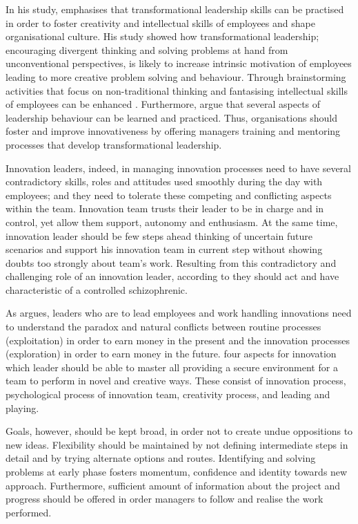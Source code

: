 In his study, \citet{jung2001transformational} emphasises that transformational leadership skills can be practised in order to foster creativity and intellectual skills of employees and shape organisational culture. His study showed how transformational leadership; encouraging divergent thinking and solving problems at hand from unconventional perspectives, is likely to increase intrinsic motivation of employees leading to more creative problem solving and behaviour.  Through brainstorming activities that focus on non-traditional thinking and fantasising intellectual skills of employees can be enhanced \citep{sosik1998transformational}. Furthermore, \citet{jung2003role} argue that several aspects of leadership behaviour can be learned and practiced. Thus, organisations should foster and improve innovativeness by offering managers training and mentoring processes that develop transformational leadership. 

Innovation leaders, indeed, in managing innovation processes need to have several contradictory skills, roles and attitudes used smoothly during the day with employees; and they need to tolerate these competing and conflicting aspects within the team. Innovation team trusts their leader to be in charge and in control, yet allow them support, autonomy and enthusiasm.  At the same time, innovation leader should be few steps ahead thinking of uncertain future scenarios and support his innovation team in current step without showing doubts too strongly about team's work. \citep{buijs2007innovation} Resulting from this contradictory and challenging role of an innovation leader, according to \citet{buijs2007innovation} they should act and have characteristic of a controlled schizophrenic. 

As \citet{buijs2007innovation} argues, leaders who are to lead employees and work handling innovations need to understand the paradox and natural conflicts between routine processes (exploitation) in order to earn money in the present and the innovation processes (exploration) in order to earn money in the future. \citet{buijs2007innovation} four aspects for innovation which leader should be able to master all providing a secure environment for a team to perform in novel and creative ways. These consist of innovation process, psychological process of innovation team, creativity process, and leading and playing. 

Goals, however, should be kept broad, in order not to create undue oppositions to new ideas. Flexibility should be maintained by not defining intermediate steps in detail and by trying alternate options and routes. Identifying and solving problems at early phase fosters momentum, confidence and identity towards new approach. Furthermore, sufficient amount of information about the project and progress should be offered in order managers to follow and realise the work performed.  \citep{quinn1985managing}

